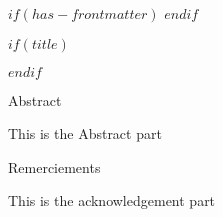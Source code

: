 $if(has-frontmatter)$
\frontmatter
$endif$

$if(title)$

$endif$

\newpage


\begin{center}
\Large{Abstract}
\end{center}

\vspace*{\baselineskip}

This is the Abstract part

\newpage


\begin{center}
\Large{Remerciements}
\end{center}

\vspace*{\baselineskip}

This is the acknowledgement part

\newpage
